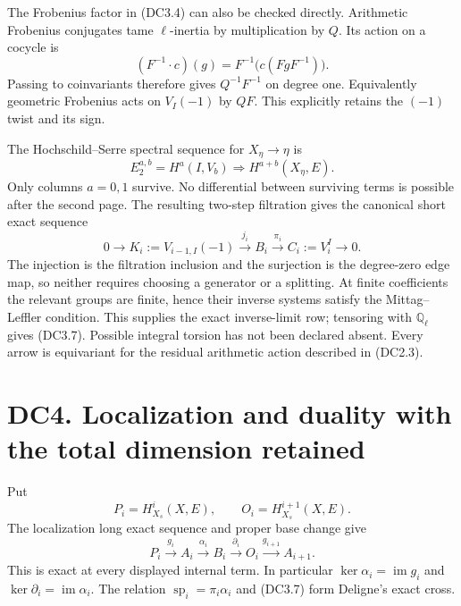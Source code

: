 \documentclass[
]{report}
\begin{document}
The Frobenius factor in (DC3.4) can also be checked directly. Arithmetic
Frobenius conjugates tame \(\ell\)-inertia by multiplication by \(Q\).
Its action on a cocycle is \[
(F^{-1}\cdot c)(g)=F^{-1}\bigl(c(FgF^{-1})\bigr).
\tag{DC3.5}
\] Passing to coinvariants therefore gives \(Q^{-1}F^{-1}\) on degree
one. Equivalently geometric Frobenius acts on \(V_I(-1)\) by \(QF\).
This explicitly retains the \((-1)\) twist and its sign.

The Hochschild--Serre spectral sequence for \(X_\eta\to\eta\) is \[
E_2^{a,b}=H^a(I,V_b)\Longrightarrow H^{a+b}(X_\eta,E).
\tag{DC3.6}
\] Only columns \(a=0,1\) survive. No differential between surviving
terms is possible after the second page. The resulting two-step
filtration gives the canonical short exact sequence \[
0\longrightarrow K_i:=V_{i-1,I}(-1)
 \xrightarrow{j_i}B_i
 \xrightarrow{\pi_i}C_i:=V_i^I
 \longrightarrow0.
\tag{DC3.7}
\] The injection is the filtration inclusion and the surjection is the
degree-zero edge map, so neither requires choosing a generator or a
splitting. At finite coefficients the relevant groups are finite, hence
their inverse systems satisfy the Mittag--Leffler condition. This
supplies the exact inverse-limit row; tensoring with \(\mathbb Q_\ell\)
gives (DC3.7). Possible integral torsion has not been declared absent.
Every arrow is equivariant for the residual arithmetic action described
in (DC2.3).

\section{DC4. Localization and duality with the total dimension
retained}\label{dc4.-localization-and-duality-with-the-total-dimension-retained}

Put \[
P_i=H^i_{X_s}(X,E),\qquad O_i=H^{i+1}_{X_s}(X,E).
\tag{DC4.1}
\] The localization long exact sequence and proper base change give \[
P_i\xrightarrow{g_i}A_i\xrightarrow{\alpha_i}B_i
 \xrightarrow{\partial_i}O_i\xrightarrow{g_{i+1}}A_{i+1}.
\tag{DC4.2}
\] This is exact at every displayed internal term. In particular
\(\ker\alpha_i=\operatorname{im}g_i\) and
\(\ker\partial_i=\operatorname{im}\alpha_i\). The relation
\(\operatorname{sp}_i=\pi_i\alpha_i\) and (DC3.7) form Deligne's exact
cross.
\end{document}
